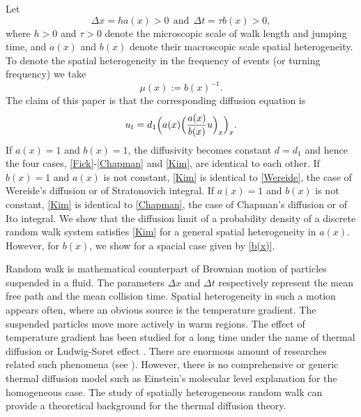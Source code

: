 \documentclass[11pt]{amsart}
\begin{document}
Let
\begin{equation}\label{ab}
\Delta x=ha(x)>0\ \ \text{and}\ \ \Delta t=\tau b(x)>0,
\end{equation}
where $h>0$ and $\tau>0$ denote the microscopic scale of walk length and jumping time, and $a(x)$ and $b(x)$ denote their macroscopic scale spatial heterogeneity. To denote the spatial heterogeneity in the frequency of events (or turning frequency) we take
\begin{equation}\label{mu}
\mu(x):=b(x)^{-1}.
\end{equation}
The claim of this paper is that the corresponding diffusion equation is
\begin{equation}\label{Kim}
u_t=d_1\Big(a(x)\Big({a(x)\over b(x)}u\Big)_x\Big)_x.
\end{equation}
If $a(x)=1$ and $b(x)=1$, the diffusivity becomes constant $d=d_1$ and hence the four cases, \eqref{Fick}-\eqref{Chapman} and \eqref{Kim}, are identical to each other. If $b(x)=1$ and $a(x)$ is not constant, \eqref{Kim} is identical to \eqref{Wereide}, the case of Wereide's diffusion or of Stratonovich integral. If $a(x)=1$ and $b(x)$ is not constant, \eqref{Kim} is identical to \eqref{Chapman}, the case of Chapman's diffusion or of Ito integral. We show that the diffusion limit of a probability density of a discrete random walk system satisfies \eqref{Kim} for a general spatial heterogeneity in $a(x)$. However, for $b(x)$, we show for a spacial case given by \eqref{b(x)}.

Random walk is mathematical counterpart of Brownian motion of particles suspended in a fluid. The parameters $\Delta x$ and $\Delta t$ respectively represent the mean free path and the mean collision time. Spatial heterogeneity in such a motion appears often, where an obvious source is the temperature gradient. The suspended particles move more actively in warm regions. The effect of temperature gradient has been studied for a long time under the name of thermal diffusion or Ludwig-Soret effect \cite{Ludwig1856,Soret1879}. There are enormous amount of researches related such phenomena (see \cite{Braun2004, Duhr2006, Eslamian2009, Harstad2009, Huang2010,14,Putnam2007,Srinivasan2011}). However, there is no comprehensive or generic thermal diffusion model such as Einstein's molecular level explanation for the homogeneous case. The study of spatially heterogeneous random walk can provide a theoretical background for the thermal diffusion theory.
\end{document}
